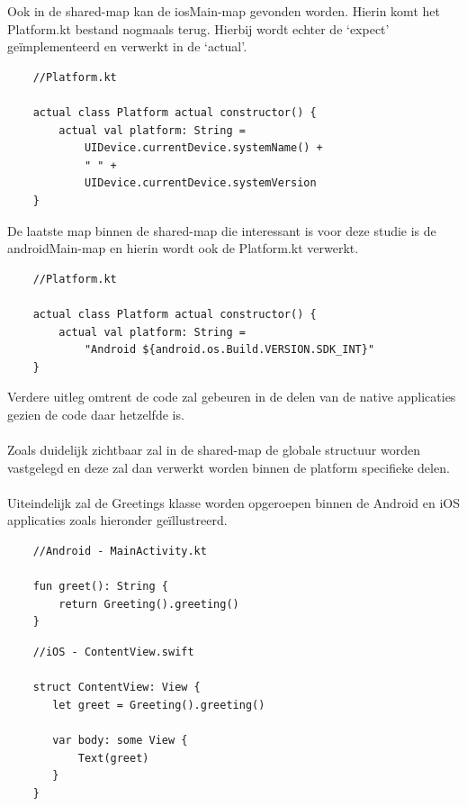 Ook in de shared-map kan de iosMain-map gevonden worden. Hierin komt het Platform.kt bestand nogmaals terug. Hierbij wordt echter de `expect' geïmplementeerd en verwerkt in de `actual'. 

\begin{lstlisting}
    //Platform.kt
    
    actual class Platform actual constructor() {
        actual val platform: String = 
            UIDevice.currentDevice.systemName() + 
            " " + 
            UIDevice.currentDevice.systemVersion
    }
\end{lstlisting}

De laatste map binnen de shared-map die interessant is voor deze studie is de androidMain-map en hierin wordt ook de Platform.kt verwerkt.

\begin{lstlisting}
    //Platform.kt
    
    actual class Platform actual constructor() {
        actual val platform: String = 
            "Android ${android.os.Build.VERSION.SDK_INT}"
    }
\end{lstlisting}

Verdere uitleg omtrent de code zal gebeuren in de delen van de native applicaties gezien de code daar hetzelfde is.
\\ \\ 
Zoals duidelijk zichtbaar zal in de shared-map de globale structuur worden vastgelegd en deze zal dan verwerkt worden binnen de platform specifieke delen.
\\ \\ 
Uiteindelijk zal de Greetings klasse worden opgeroepen binnen de Android en iOS applicaties zoals hieronder geïllustreerd.
\begin{lstlisting}
    //Android - MainActivity.kt
    
    fun greet(): String {
        return Greeting().greeting()
    }
\end{lstlisting}
\begin{lstlisting}
    //iOS - ContentView.swift
    
    struct ContentView: View {
       let greet = Greeting().greeting()
       
       var body: some View {
           Text(greet)
       }
    }
   
\end{lstlisting}

